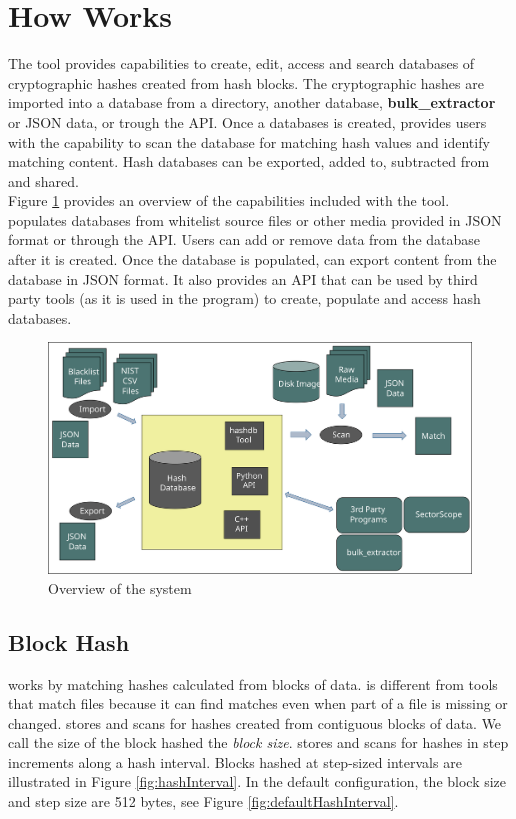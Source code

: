 \documentclass[11pt,fleqn]{article} %
\begin{document}
\section{How \hdb Works}
The \hdb tool provides capabilities to create, edit, access and search databases of cryptographic hashes created from hash blocks. The cryptographic hashes are imported into a database from a directory, another database, \textbf{bulk\_extractor} or JSON data, or trough the \hdb API.
Once a databases is created, \hdb provides users with the capability to scan the database for matching hash values and identify matching content. Hash databases can be exported, added to, subtracted from and shared.\\


Figure \ref{fig:overviewFigure} provides an overview of the capabilities included with the \hdb tool. \hdb populates databases from whitelist source files
or other media provided in JSON format or through the API.
Users can add or remove data from the database after it is created.
Once the database is populated, \hdb can export content from the database in JSON format. It also provides an API that can be used by third party tools (as it is used in the \bulk program) to create, populate and access hash databases.\\

\begin{figure}
	\center
	\includegraphics[scale=.45]{drawings/hashdb_system_overview}
	\caption{Overview of the \hdb system}
	\label{fig:overviewFigure}
\end{figure}

\subsection{Block Hash}
\label{BlockHash}
\hdb works by matching hashes calculated from blocks of data.  \hdb is different from tools that match files because it can find matches even when part of a file is missing or changed.  \hdb stores and scans for hashes created from contiguous blocks of data.  We call the size of the block hashed the \textit{block size}.  \hdb stores and scans for hashes in step increments along a hash interval. Blocks hashed at step-sized intervals are illustrated in Figure \ref{fig:hashInterval}.  In the default configuration, the block size and step size are 512 bytes, see Figure \ref{fig:defaultHashInterval}.\\
\end{document}
